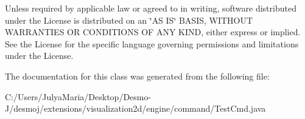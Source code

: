 Unless required by applicable law or agreed to in writing, software distributed under the License is distributed on an \char`\"{}\-A\-S I\-S\char`\"{} B\-A\-S\-I\-S, W\-I\-T\-H\-O\-U\-T W\-A\-R\-R\-A\-N\-T\-I\-E\-S O\-R C\-O\-N\-D\-I\-T\-I\-O\-N\-S O\-F A\-N\-Y K\-I\-N\-D, either express or implied. See the License for the specific language governing permissions and limitations under the License. 

The documentation for this class was generated from the following file\-:\begin{DoxyCompactItemize}
\item 
C\-:/\-Users/\-Julya\-Maria/\-Desktop/\-Desmo-\/\-J/desmoj/extensions/visualization2d/engine/command/Test\-Cmd.\-java\end{DoxyCompactItemize}
